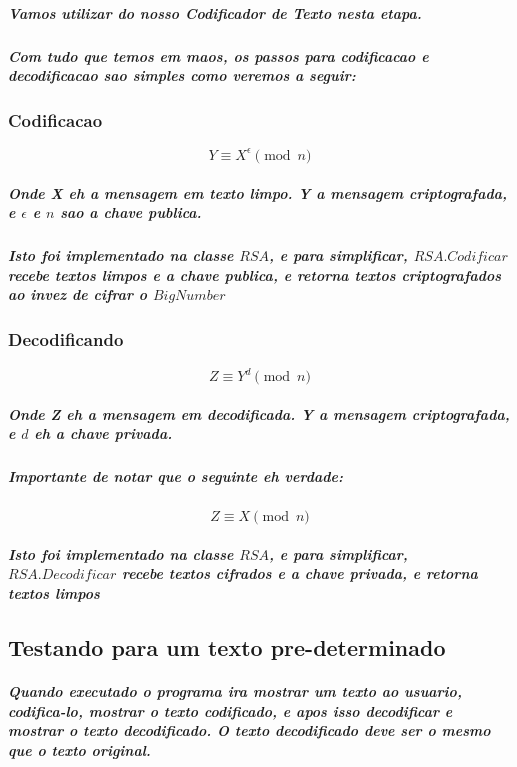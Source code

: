 \documentclass[12pt,twoside, a4paper, twocolumn]{article}
\begin{document}
\subparagraph*{Vamos utilizar do nosso \emph{Codificador de Texto} nesta etapa.}

\subparagraph*{Com tudo que temos em maos, os passos para codificacao e decodificacao sao simples como veremos a seguir:}

\subsubsection{Codificacao}

\begin{equation}
    Y \equiv X^{\epsilon} \pmod{n}
\end{equation}

\subparagraph*{Onde X eh a mensagem em texto limpo. Y a mensagem criptografada, e $\epsilon$ e $n$ sao a chave publica.}

\subparagraph*{Isto foi implementado na classe $RSA$, e para simplificar, $RSA.Codificar$ recebe textos limpos e a chave publica, e retorna textos criptografados ao invez de cifrar o $BigNumber$}

\subsubsection{Decodificando}

\begin{equation}
    Z \equiv Y^{d} \pmod{n}
\end{equation}

\subparagraph*{Onde Z eh a mensagem em decodificada. Y a mensagem criptografada, e $d$ eh a chave privada.}

\subparagraph*{Importante de notar que o seguinte eh verdade:}

\begin{equation}
    Z \equiv X \pmod{n}
\end{equation}

\subparagraph*{Isto foi implementado na classe $RSA$, e para simplificar, $RSA.Decodificar$ recebe textos cifrados e a chave privada, e retorna textos limpos}

\subsection{Testando para um texto pre-determinado}

\subparagraph*{Quando executado o programa ira mostrar um texto ao usuario, codifica-lo, mostrar o texto codificado, e apos isso decodificar e mostrar o texto decodificado. O texto decodificado deve ser o mesmo que o texto original.}
\end{document}
